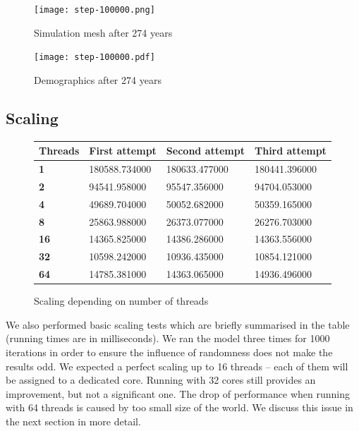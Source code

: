 \documentclass[a4paper]{article}
\begin{document}
\begin{figure}[pht]
    \centering
    \texttt{[image: step-100000.png]}
    \caption{Simulation mesh after 274 years}
    \texttt{[image: step-100000.pdf]}
    \caption{Demographics after 274 years}
\end{figure}

\subsection{Scaling}

\begin{figure}[ht]
    \centering
    \begin{tabu} {| X[0.8,c,p] || X[1,c,p] | X[1,c,p] | X[1,c,p] |}
        \rowfont{\bfseries}
        \hline
        Threads &
        First attempt &
        Second attempt&
        Third attempt \\
        \hline
        \hline
        \textbf{1} & 180588.734000 & 180633.477000 & 180441.396000 \\
        \hline
        \textbf{2} & 94541.958000 & 95547.356000 & 94704.053000 \\
        \hline
        \textbf{4} & 49689.704000 & 50052.682000 & 50359.165000 \\
        \hline
        \textbf{8} & 25863.988000 & 26373.077000 & 26276.703000 \\
        \hline
        \textbf{16} & 14365.825000 & 14386.286000 & 14363.556000 \\
        \hline
        \textbf{32} & 10598.242000 & 10936.435000 & 10854.121000 \\
        \hline
        \textbf{64} & 14785.381000 & 14363.065000 & 14936.496000 \\
        \hline
    \end{tabu}
    \caption{Scaling depending on number of threads}
\end{figure}

We also performed basic scaling tests which are briefly summarised in the table (running times are in milliseconds).
We ran the model three times for 1000 iterations in order to ensure the influence of randomness does not make the results odd.
We expected a perfect scaling up to 16 threads -- each of them will be assigned to a dedicated core.
Running with 32 cores still provides an improvement, but not a significant one.
The drop of performance when running with 64 threads is caused by too small size of the world.
We discuss this issue in the next section in more detail.
\end{document}
